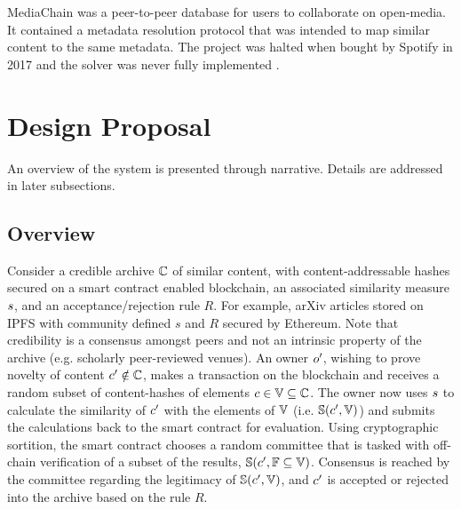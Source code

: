 \documentclass[conference]{IEEEtran}
\begin{document}
MediaChain was a peer-to-peer database for users to collaborate on open-media. It contained a metadata resolution protocol that was intended to map similar content to the same metadata. The project was halted when bought by Spotify in 2017 and the solver was never fully implemented \cite{perez2017spotify}.



\section{Design Proposal}
An overview of the system is presented through narrative. Details are addressed in later subsections. 
\subsection{Overview}\label{overview}
Consider a credible archive ${{\mathbb{C}}}$ of similar content, with content-addressable hashes secured on a smart contract enabled blockchain, an associated similarity measure ${s}$, and an acceptance/rejection rule $R$. For example, arXiv articles stored on IPFS with community defined $s$ and $R$ secured by Ethereum. Note that credibility is a consensus amongst peers and not an intrinsic property of the archive (e.g. scholarly peer-reviewed venues). An owner ${o}^\prime$,  wishing to prove novelty of content ${c}^\prime \notin {{\mathbb{C}}}$, makes a transaction on the blockchain and receives a random subset of content-hashes of elements ${c} \in {\mathbb{V}} \subseteq {{\mathbb{C}}}$. The owner now uses ${s}$ to calculate the similarity of ${c}^\prime$ with the elements of ${\mathbb{V}}$ (i.e. ${\mathbb{S}}({c}^\prime, {\mathbb{V}})$) and submits the calculations back to the smart contract for evaluation. Using cryptographic sortition, the smart contract chooses a random committee that is tasked with off-chain verification of a subset of the results, ${\mathbb{S}}({c}^\prime, {\mathbb{F}} \subseteq {\mathbb{V}})$. Consensus is reached by the committee regarding the legitimacy of ${\mathbb{S}}({c}^\prime, {\mathbb{V}})$, and ${c}^\prime$ is accepted or rejected into the archive based on the rule $R$.
\end{document}
